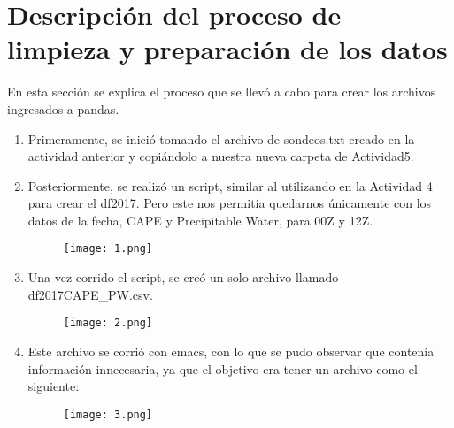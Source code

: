 \documentclass[a4paper]{article}
\begin{document}
\section{Descripción del proceso de limpieza y preparación de los datos}

En esta sección se explica el proceso que se llevó a cabo para crear los archivos ingresados a pandas. 

\begin{enumerate}
\item Primeramente, se inició tomando el archivo de sondeos.txt creado en la actividad anterior y copiándolo a nuestra nueva carpeta de Actividad5. 
\item Posteriormente, se realizó un script, similar al utilizando en la Actividad 4 para crear el df2017. Pero este nos permitía quedarnos únicamente con los datos de la fecha, CAPE y Precipitable Water, para 00Z y 12Z. \\

\begin{figure}[h!]
  \texttt{[image: 1.png]}
  \centering
  \label{fig:1}
\end{figure}

\item Una vez corrido el script, se creó un solo archivo llamado df2017CAPE\_PW.csv.

\begin{figure}[h!]
  \texttt{[image: 2.png]}
  \centering
  \label{fig:2}
\end{figure}
\item Este archivo se corrió con emacs, con lo que se pudo observar que contenía información innecesaria, ya que el objetivo era tener un archivo como el siguiente:

\begin{figure}[h!]
  \texttt{[image: 3.png]}
  \centering
  \label{fig:3}
\end{figure}


\end{enumerate}
\end{document}
